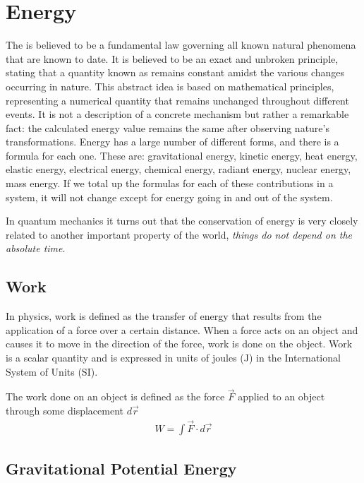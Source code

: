\section{Energy}

The  is believed to be a fundamental law governing all known natural phenomena that are known to date. It is believed to be an exact and unbroken principle, stating that a quantity known as  remains constant amidst the various changes occurring in nature. This abstract idea is based on mathematical principles, representing a numerical quantity that remains unchanged throughout different events. It is not a description of a concrete mechanism but rather a remarkable fact: the calculated energy value remains the same after observing nature's transformations. Energy has a large number of different forms, and there is a formula for each one. These are: gravitational energy, kinetic energy, heat energy, elastic energy, electrical energy, chemical energy, radiant energy, nuclear energy, mass energy. If we total up the formulas for each of these contributions in a system, it will not change except for energy going in and out of the system.

In quantum mechanics it turns out that the conservation of energy is very closely related to another important property of the world, \textit{things do not depend on the absolute time}.

\subsection{Work}

In physics, work is defined as the transfer of energy that results from the application of a force over a certain distance. When a force acts on an object and causes it to move in the direction of the force, work is done on the object. Work is a scalar quantity and is expressed in units of joules (J) in the International System of Units (SI). 

\begin{defn}{1}
	The work done on an object is defined as the force $\vec{F}$ applied to an object through some displacement $d\vec{r}$
	\begin{align}
		W = \int \vec{F}\cdot d\vec{r}
	\end{align}
\end{defn}

\subsection{Gravitational Potential Energy}

